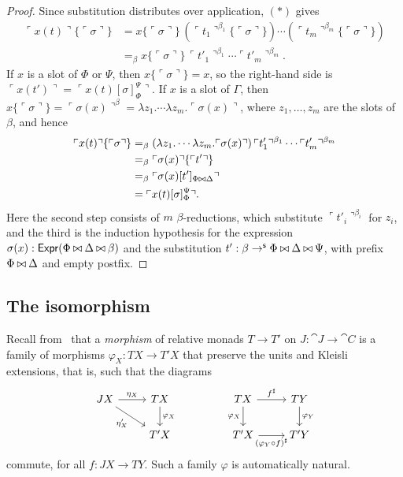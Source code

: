 \begin{proof}
    Since substitution distributes over application, $(*)$ gives
    \begin{align*}    
        \ulcorner x(t) \urcorner\{\ulcorner \sigma \urcorner\} &= x\{\ulcorner \sigma \urcorner\}\, \left(\ulcorner t_1 \urcorner^{\beta_1}\{\ulcorner \sigma \urcorner\}\right) \cdots \left(\ulcorner t_m \urcorner^{\beta_m}\{\ulcorner \sigma \urcorner\}\right)\\
        &=_\beta x\{\ulcorner \sigma \urcorner\}\, \ulcorner t'_1 \urcorner^{\beta_1} \cdots \ulcorner t'_m \urcorner^{\beta_m}.
    \end{align*}
    If $x$ is a slot of $\Phi$ or $\Psi$, then $x\{\ulcorner \sigma \urcorner\} = x$, so the right-hand side is $\ulcorner x(t') \urcorner = \ulcorner x(t)[\sigma]_\Phi^\Psi \urcorner$. If $x$ is a slot of $\Gamma$, then $x\{\ulcorner \sigma \urcorner\} = \ulcorner \sigma(x) \urcorner^\beta = \lambda z_1. \cdots \lambda z_m. \ulcorner \sigma(x) \urcorner$, where $z_1, \ldots, z_m$ are the slots of $\beta$, and hence
    \begin{align*}
        \ulcorner x(t) \urcorner\{\ulcorner \sigma \urcorner\}
        &=_\beta (\lambda z_1. \cdots \lambda z_m. \ulcorner \sigma(x) \urcorner)\, \ulcorner t'_1 \urcorner^{\beta_1} \cdots \ulcorner t'_m \urcorner^{\beta_m}\\
        &=_\beta \ulcorner \sigma(x) \urcorner\{\ulcorner t' \urcorner\}\\
        &=_\beta \ulcorner \sigma(x)[t']_{\Phi \mathbin{\bowtie} \Delta} \urcorner\\
        &= \ulcorner x(t)[\sigma]_\Phi^\Psi \urcorner.
    \end{align*}
    Here the second step consists of $m$ $\beta$-reductions, which substitute $\ulcorner t'_i \urcorner^{\beta_i}$ for $z_i$, and the third is the induction hypothesis for the expression $\sigma(x) : \mathsf{Expr}(\Phi \mathbin{\bowtie} \Delta \mathbin{\bowtie} \beta)$ and the substitution $t' : \beta \to^{\mathsf{s}} \Phi \mathbin{\bowtie} \Delta \mathbin{\bowtie} \Psi$, with prefix $\Phi \mathbin{\bowtie} \Delta$ and empty postfix.
\end{proof}

\subsection{The isomorphism}

Recall from~\cite[Def.~2.2]{AltenkirchChapmanUustalu2015} that a \emph{morphism} of relative monads $T \to T'$ on $J : \cat{J} \to \cat{C}$ is a family of morphisms $\varphi_X : TX \to T'X$ that preserve the units and Kleisli extensions, that is, such that the diagrams
\[\begin{tikzcd}
        JX & TX && TX & TY \\
        & {T'X} && {T'X} & {T'Y}
        \arrow["{\eta_X}", from=1-1, to=1-2]
        \arrow["{\eta'_X}"', from=1-1, to=2-2]
        \arrow["{\varphi_X}", from=1-2, to=2-2]
        \arrow["{f^\sharp}", from=1-4, to=1-5]
        \arrow["{\varphi_X}"', from=1-4, to=2-4]
        \arrow["{\varphi_Y}", from=1-5, to=2-5]
        \arrow["{(\varphi_Y \circ f)^\sharp}"', from=2-4, to=2-5]
\end{tikzcd}\]
commute, for all $f : JX \to TY$. Such a family $\varphi$ is automatically natural.

